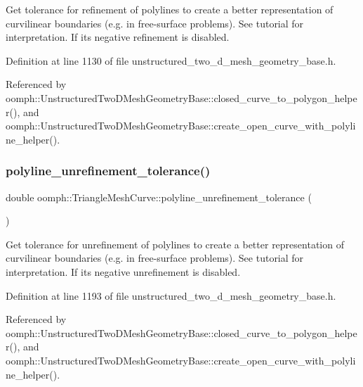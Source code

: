 Get tolerance for refinement of polylines to create a better representation of curvilinear boundaries (e.\+g. in free-\/surface problems). See tutorial for interpretation. If it\textquotesingle{}s negative refinement is disabled. 



Definition at line 1130 of file unstructured\+\_\+two\+\_\+d\+\_\+mesh\+\_\+geometry\+\_\+base.\+h.



Referenced by oomph\+::\+Unstructured\+Two\+D\+Mesh\+Geometry\+Base\+::closed\+\_\+curve\+\_\+to\+\_\+polygon\+\_\+helper(), and oomph\+::\+Unstructured\+Two\+D\+Mesh\+Geometry\+Base\+::create\+\_\+open\+\_\+curve\+\_\+with\+\_\+polyline\+\_\+helper().

\mbox{\label{classoomph_1_1TriangleMeshCurve_a9c134821bab203824f06994db321a840}} 
\subsubsection{\texorpdfstring{polyline\+\_\+unrefinement\+\_\+tolerance()}{polyline\_unrefinement\_tolerance()}}
{\footnotesize\ttfamily double oomph\+::\+Triangle\+Mesh\+Curve\+::polyline\+\_\+unrefinement\+\_\+tolerance (\begin{DoxyParamCaption}{ }\end{DoxyParamCaption})\hspace{0.3cm}{\ttfamily [inline]}}



Get tolerance for unrefinement of polylines to create a better representation of curvilinear boundaries (e.\+g. in free-\/surface problems). See tutorial for interpretation. If it\textquotesingle{}s negative unrefinement is disabled. 



Definition at line 1193 of file unstructured\+\_\+two\+\_\+d\+\_\+mesh\+\_\+geometry\+\_\+base.\+h.



Referenced by oomph\+::\+Unstructured\+Two\+D\+Mesh\+Geometry\+Base\+::closed\+\_\+curve\+\_\+to\+\_\+polygon\+\_\+helper(), and oomph\+::\+Unstructured\+Two\+D\+Mesh\+Geometry\+Base\+::create\+\_\+open\+\_\+curve\+\_\+with\+\_\+polyline\+\_\+helper().

